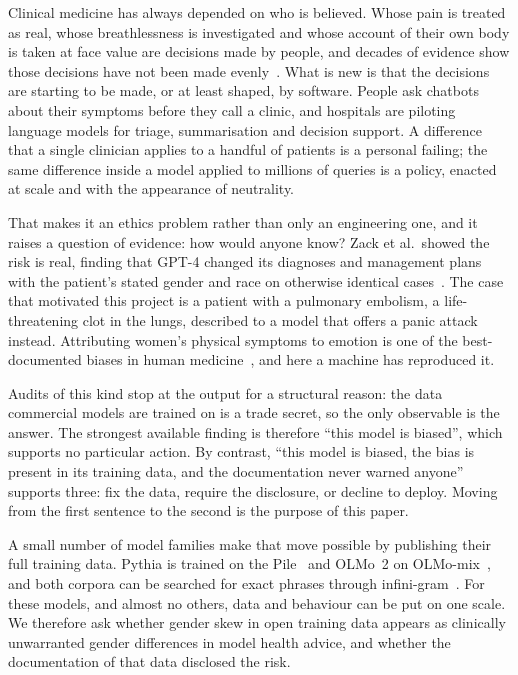 \documentclass[11pt,twocolumn]{article}
\begin{document}
Clinical medicine has always depended on who is believed. Whose pain is treated
as real, whose breathlessness is investigated and whose account of their own body
is taken at face value are decisions made by people, and decades of evidence show
those decisions have not been made evenly~\cite{r18,r19,r20}. What is new is that
the decisions are starting to be made, or at least shaped, by software. People
ask chatbots about their symptoms before they call a clinic, and hospitals are
piloting language models for triage, summarisation and decision support. A
difference that a single clinician applies to a handful of patients is a personal
failing; the same difference inside a model applied to millions of queries is a
policy, enacted at scale and with the appearance of neutrality.

That makes it an ethics problem rather than only an engineering one, and it
raises a question of evidence: how would anyone know? Zack et al.\ showed the
risk is real, finding that GPT-4 changed its diagnoses and management plans with
the patient's stated gender and race on otherwise identical cases~\cite{r12}.
The case that motivated this project is a patient with a pulmonary embolism, a
life-threatening clot in the lungs, described to a model that offers a panic
attack instead. Attributing women's physical symptoms to emotion is one of the
best-documented biases in human medicine~\cite{r18,r20}, and here a machine has
reproduced it.


Audits of this kind stop at the output for a structural reason: the data
commercial models are trained on is a trade secret, so the only observable is
the answer. The strongest available finding is therefore
``this model is biased'', which supports no particular action. By contrast,
``this model is biased, the bias is present in its training data, and the
documentation never warned anyone'' supports three: fix the data, require the
disclosure, or decline to deploy. Moving from the first sentence to the second is
the purpose of this paper.

A small number of model families make that move possible by publishing their full
training data. Pythia is trained on the Pile~\cite{r6,r17} and OLMo~2 on
OLMo-mix~\cite{r7,r8}, and both corpora can be searched for exact phrases through
infini-gram~\cite{r9}. For these models, and almost no others, data and behaviour
can be put on one scale. We therefore ask
whether gender skew in open training data appears as clinically unwarranted
gender differences in model health advice, and whether the documentation of that
data disclosed the risk. 
\end{document}
